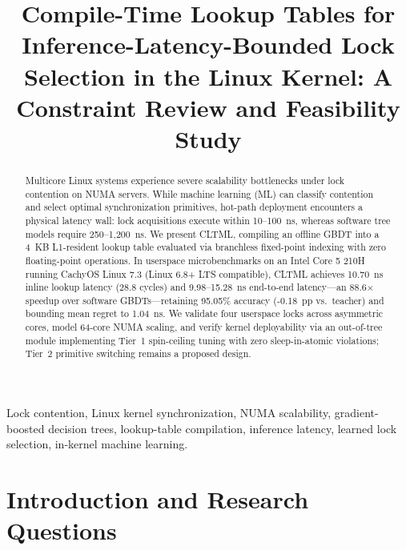 \documentclass[conference]{IEEEtran}
\begin{document}
\title{Compile-Time Lookup Tables for Inference-Latency-Bounded Lock Selection in the Linux Kernel: A Constraint Review and Feasibility Study}

\author{
\and
{}
}

\maketitle

\begin{abstract}
Multicore Linux systems experience severe scalability bottlenecks under lock contention on NUMA servers. While machine learning (ML) can classify contention and select optimal synchronization primitives, hot-path deployment encounters a physical latency wall: lock acquisitions execute within 10--100~ns, whereas software tree models require 250--1,200~ns. We present CLTML, compiling an offline GBDT into a 4~KB L1-resident lookup table evaluated via branchless fixed-point indexing with zero floating-point operations. In userspace microbenchmarks on an Intel Core 5 210H running CachyOS Linux 7.3 (Linux 6.8+ LTS compatible), CLTML achieves 10.70~ns inline lookup latency (28.8 cycles) and 9.98--15.28~ns end-to-end latency---an 88.6$\times$ speedup over software GBDTs---retaining 95.05\% accuracy (-0.18~pp vs.\ teacher) and bounding mean regret to 1.04~ns. We validate four userspace locks across asymmetric cores, model 64-core NUMA scaling, and verify kernel deployability via an out-of-tree module implementing Tier~1 spin-ceiling tuning with zero sleep-in-atomic violations; Tier~2 primitive switching remains a proposed design.
\end{abstract}

\begin{IEEEkeywords}
Lock contention, Linux kernel synchronization, NUMA scalability, gradient-boosted decision trees, lookup-table compilation, inference latency, learned lock selection, in-kernel machine learning.
\end{IEEEkeywords}

\section{Introduction and Research Questions}
\end{document}
